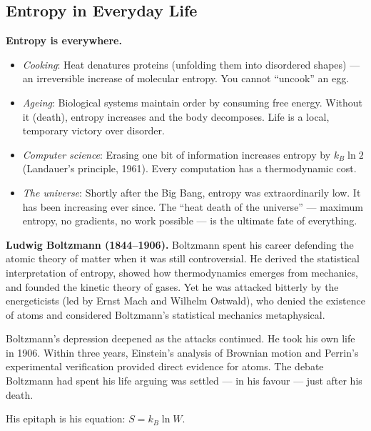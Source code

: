 \documentclass[12pt, a4paper, twoside]{book}
\begin{document}
\subsection{Entropy in Everyday Life}

\begin{realworldbox}
\textbf{Entropy is everywhere.}
\begin{itemize}[leftmargin=1.5em,itemsep=4pt]
  \item \textit{Cooking}: Heat denatures proteins (unfolding them into disordered shapes) --- an irreversible increase of molecular entropy. You cannot ``uncook'' an egg.
  \item \textit{Ageing}: Biological systems maintain order by consuming free energy. Without it (death), entropy increases and the body decomposes. Life is a local, temporary victory over disorder.
  \item \textit{Computer science}: Erasing one bit of information increases entropy by $k_B\ln 2$ (Landauer's principle, 1961). Every computation has a thermodynamic cost.
  \item \textit{The universe}: Shortly after the Big Bang, entropy was extraordinarily low. It has been increasing ever since. The ``heat death of the universe'' --- maximum entropy, no gradients, no work possible --- is the ultimate fate of everything.
\end{itemize}
\end{realworldbox}

\begin{historybox}
\textbf{Ludwig Boltzmann (1844--1906).} Boltzmann spent his career defending the atomic theory of matter when it was still controversial. He derived the statistical interpretation of entropy, showed how thermodynamics emerges from mechanics, and founded the kinetic theory of gases. Yet he was attacked bitterly by the energeticists (led by Ernst Mach and Wilhelm Ostwald), who denied the existence of atoms and considered Boltzmann's statistical mechanics metaphysical.

Boltzmann's depression deepened as the attacks continued. He took his own life in 1906. Within three years, Einstein's analysis of Brownian motion and Perrin's experimental verification provided direct evidence for atoms. The debate Boltzmann had spent his life arguing was settled --- in his favour --- just after his death.

His epitaph is his equation: $S = k_B \ln W$.
\end{historybox}
\end{document}
